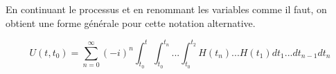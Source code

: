 En continuant le processus et en renommant les variables comme il faut, on obtient une forme générale pour cette notation alternative.

\begin{equation}
    U(t,t_0) = \sum_{n=0}^{\infty} (-i)^n \int_{t_0}^{t}\int_{t_0}^{t_n}...\int_{t_0}^{t_2}H(t_n)...H(t_1)dt_1 ... dt_{n-1} dt_n
\end{equation}








